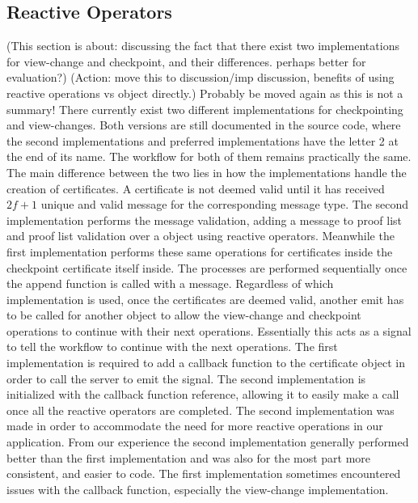 \subsection{Reactive Operators}
(This section is about: discussing the fact that there exist two implementations for view-change and checkpoint, and their differences. perhaps better for evaluation?)
(Action: move this to discussion/imp discussion, benefits of using reactive operations vs object directly.)
Probably be moved again as this is not a summary!
There currently exist two different implementations for checkpointing and view-changes. Both versions are still documented in the source code, where the second implementations and preferred implementations have the letter 2 at the end of its name. The workflow for both of them remains practically the same. The main difference between the two lies in how the implementations handle  the creation of certificates. A certificate is not deemed valid until it has received $2f+1$ unique and valid message for the corresponding message type. The second implementation performs the message validation, adding a message to proof list and proof list validation over a  object using reactive operators. Meanwhile the first implementation performs these same operations for certificates inside the checkpoint certificate itself inside. The processes are performed sequentially once the append function is called with a message. Regardless of which implementation is used, once the certificates are deemed valid, another emit has to be called for another  object to allow the view-change and checkpoint operations to continue with their next operations. Essentially this  acts as a signal to tell the workflow to continue with the next operations. The first implementation is required to add a callback function to the certificate object in order to call the server to emit the signal. The second implementation is initialized with the callback function reference, allowing it to easily make a call once all the reactive operators are completed. The second implementation was made in order to accommodate the need for more reactive operations in our application. From our experience the second implementation generally performed better than the first implementation and was also for the most part more consistent, and easier to code. The first implementation sometimes encountered issues with the callback function, especially the view-change implementation. 


